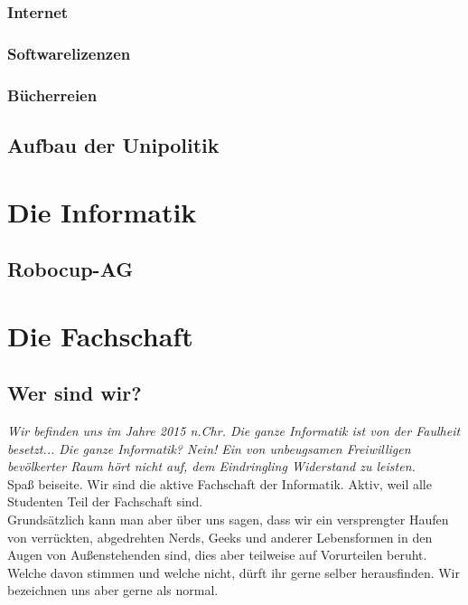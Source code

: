 \documentclass[12pt,a4paper]{scrartcl}
\begin{document}
		\subsubsection{Internet}
		\subsubsection{Softwarelizenzen}
		\subsubsection{Bücherreien}
	\subsection{Aufbau der Unipolitik}
\section{Die Informatik}
	\subsection{Robocup-AG}

\label{fachschaftsarbeit}
\section{Die Fachschaft}
	\subsection{Wer sind wir?}
		\glqq\textit{ Wir befinden uns im Jahre 2015 n.Chr. Die ganze Informatik ist von der Faulheit besetzt... Die ganze Informatik? Nein! Ein von unbeugsamen Freiwilligen bevölkerter Raum hört nicht auf, dem Eindringling  Widerstand zu leisten.} \grqq \\
		Spaß beiseite. Wir sind die aktive Fachschaft der Informatik. Aktiv, weil alle Studenten Teil der Fachschaft sind. \\
		Grundsätzlich kann man aber über uns sagen, dass wir ein versprengter Haufen von verrückten, abgedrehten Nerds, Geeks und anderer Lebensformen in den Augen von Außenstehenden sind, dies aber teilweise auf Vorurteilen  
	beruht. Welche davon stimmen und welche nicht, dürft ihr gerne selber herausfinden. Wir bezeichnen uns aber gerne als normal. 	
\end{document}

